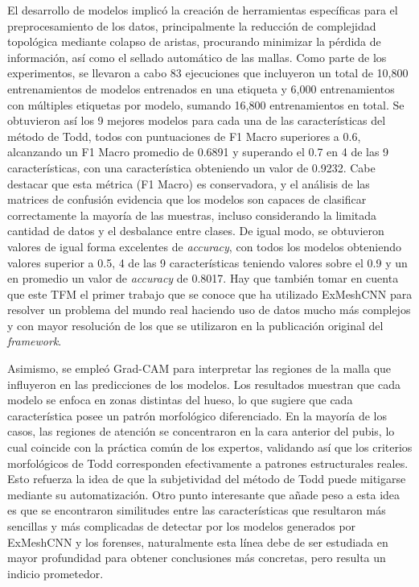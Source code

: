 El desarrollo de modelos implicó la creación de herramientas específicas para el preprocesamiento de los datos, principalmente la reducción de complejidad topológica mediante colapso de aristas, procurando minimizar la pérdida de información, así como el sellado automático de las mallas. Como parte de los experimentos, se llevaron a cabo 83 ejecuciones que incluyeron un total de 10,800 entrenamientos de modelos entrenados en una etiqueta y 6,000 entrenamientos con múltiples etiquetas por modelo, sumando 16,800 entrenamientos en total. Se obtuvieron así los 9 mejores modelos para cada una de las características del método de Todd, todos con puntuaciones de F1 Macro superiores a 0.6, alcanzando un F1 Macro promedio de 0.6891 y superando el 0.7 en 4 de las 9 características, con una característica obteniendo un valor de 0.9232. Cabe destacar que esta métrica (F1 Macro) es conservadora, y el análisis de las matrices de confusión evidencia que los modelos son capaces de clasificar correctamente la mayoría de las muestras, incluso considerando la limitada cantidad de datos y el desbalance entre clases. De igual modo, se obtuvieron valores de igual forma excelentes de \textit{accuracy}, con todos los modelos obteniendo valores superior a 0.5, 4 de las 9 características teniendo valores sobre el 0.9 y un en promedio un valor de \textit{accuracy} de 0.8017. Hay que también tomar en cuenta que este TFM el primer trabajo que se conoce que ha utilizado ExMeshCNN para resolver un problema del mundo real haciendo uso de datos mucho más complejos y con mayor resolución de los que se utilizaron en la publicación original del \textit{framework}.

Asimismo, se empleó Grad-CAM para interpretar las regiones de la malla que influyeron en las predicciones de los modelos. Los resultados muestran que cada modelo se enfoca en zonas distintas del hueso, lo que sugiere que cada característica posee un patrón morfológico diferenciado. En la mayoría de los casos, las regiones de atención se concentraron en la cara anterior del pubis, lo cual coincide con la práctica común de los expertos, validando así que los criterios morfológicos de Todd corresponden efectivamente a patrones estructurales reales. Esto refuerza la idea de que la subjetividad del método de Todd puede mitigarse mediante su automatización. Otro punto interesante que añade peso a esta idea es que se encontraron similitudes entre las características que resultaron más sencillas y más complicadas de detectar por los modelos generados por ExMeshCNN y los forenses, naturalmente esta línea debe de ser estudiada en mayor profundidad para obtener conclusiones más concretas, pero resulta un indicio prometedor.

